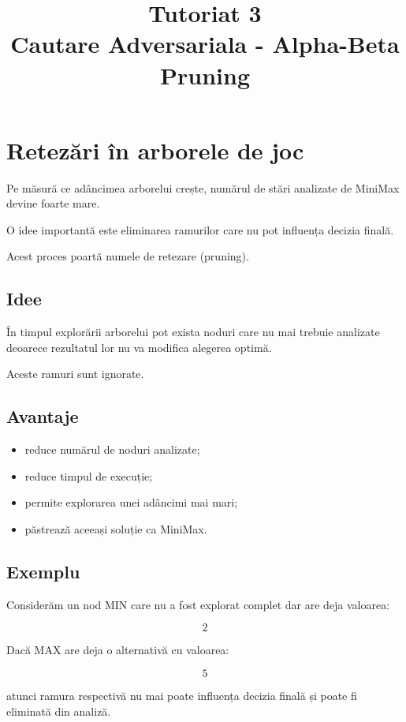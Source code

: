 \documentclass[12pt,a4paper]{article}
\title{Tutoriat 3\\Cautare Adversariala - Alpha-Beta Pruning}
\author{}
\date{}
\begin{document}
\maketitle

\section{Retezări în arborele de joc}

Pe măsură ce adâncimea arborelui crește, numărul de stări analizate de MiniMax devine foarte mare.

O idee importantă este eliminarea ramurilor care nu pot influența decizia finală.

Acest proces poartă numele de retezare (pruning).

\subsection{Idee}

În timpul explorării arborelui pot exista noduri care nu mai trebuie analizate deoarece rezultatul lor nu va modifica alegerea optimă.

Aceste ramuri sunt ignorate.

\subsection{Avantaje}

\begin{itemize}
\item reduce numărul de noduri analizate;
\item reduce timpul de execuție;
\item permite explorarea unei adâncimi mai mari;
\item păstrează aceeași soluție ca MiniMax.
\end{itemize}

\subsection{Exemplu}

Considerăm un nod MIN care nu a fost explorat complet dar are deja valoarea:

\[
2
\]

Dacă MAX are deja o alternativă cu valoarea:

\[
5
\]

atunci ramura respectivă nu mai poate influența decizia finală și poate fi eliminată din analiză.
\end{document}
